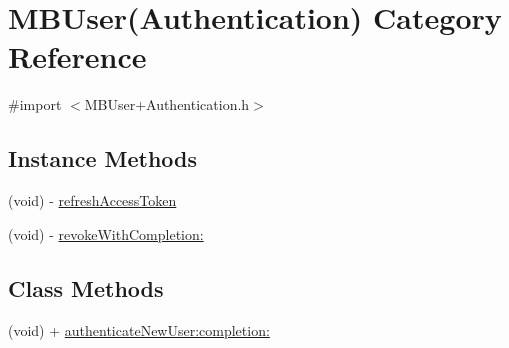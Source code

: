 \hypertarget{category_m_b_user_07_authentication_08}{\section{M\-B\-User(Authentication) Category Reference}
\label{category_m_b_user_07_authentication_08}
}


{\ttfamily \#import $<$M\-B\-User+\-Authentication.\-h$>$}

\subsection*{Instance Methods}
\begin{DoxyCompactItemize}
\item 
(void) -\/ \hyperlink{category_m_b_user_07_authentication_08_a988475a0321b26e1146e538bfee65ef6}{refresh\-Access\-Token}
\item 
(void) -\/ \hyperlink{category_m_b_user_07_authentication_08_a1e56d1480e455bac35e1a57a2db7fb47}{revoke\-With\-Completion\-:}
\end{DoxyCompactItemize}
\subsection*{Class Methods}
\begin{DoxyCompactItemize}
\item 
(void) + \hyperlink{category_m_b_user_07_authentication_08_a2cfdd3551de108fd02e909f267379947}{authenticate\-New\-User\-:completion\-:}
\end{DoxyCompactItemize}


